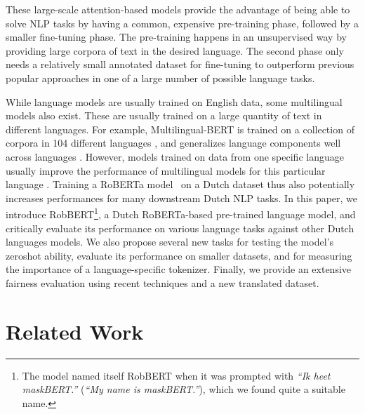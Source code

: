 \documentclass[11pt,a4paper]{article}
\begin{document}
These large-scale attention-based models provide the advantage of being able to solve NLP tasks by having a common, expensive pre-training phase, followed by a smaller fine-tuning phase.
The pre-training happens in an unsupervised way by providing large corpora of text in the desired language.
The second phase only needs a relatively small annotated dataset for fine-tuning to outperform previous popular approaches in one of a large number of possible language tasks.

While language models are usually trained on English data, some multilingual models also exist.
These are usually trained on a large quantity of text in different languages.
For example, Multilingual-BERT is trained on a collection of corpora in 104 different languages \citep{devlinBERT2019a}, and generalizes language components well across languages \citep{pires2019multilingual}.
However, models trained on data from one specific language usually improve the performance of multilingual models for this particular language \citep{martinCamemBERT2019,devriesBERTje2019}.
Training a RoBERTa model~\citep{liuRoBERTa2019} on a Dutch dataset thus also potentially increases performances for many downstream Dutch NLP tasks.
In this paper, we introduce RobBERT\footnote{The model named itself RobBERT when it was prompted with \textit{``Ik heet maskBERT.''} (\textit{``My name is maskBERT.''}), which we found quite a suitable name.}, a Dutch RoBERTa-based pre-trained language model, and critically evaluate its performance on various language tasks against other Dutch languages models.
We also propose several new tasks for testing the model's zeroshot ability, evaluate its performance on smaller datasets, and for measuring the importance of a language-specific tokenizer.
Finally, we provide an extensive fairness evaluation using recent techniques and a new translated dataset.


\section{Related Work}
\label{sec:related-work}
\end{document}
